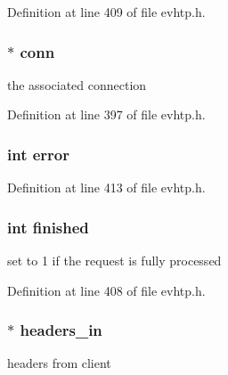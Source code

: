 \-Definition at line 409 of file evhtp.\-h.

\hypertarget{structevhtp__request__s_a313e4d80c47517f02f2fe99e8840c280}{
\subsubsection[{conn}]{$\ast$ {\bf conn}}}\label{structevhtp__request__s_a313e4d80c47517f02f2fe99e8840c280}
the associated connection 

\-Definition at line 397 of file evhtp.\-h.

\hypertarget{structevhtp__request__s_a11614f44ef4d939bdd984953346a7572}{
\subsubsection[{error}]{\setlength{\rightskip}{0pt plus 5cm}int {\bf error}}}\label{structevhtp__request__s_a11614f44ef4d939bdd984953346a7572}


\-Definition at line 413 of file evhtp.\-h.

\hypertarget{structevhtp__request__s_a49c6e6c75d41d6360253beb518425934}{
\subsubsection[{finished}]{\setlength{\rightskip}{0pt plus 5cm}int {\bf finished}}}\label{structevhtp__request__s_a49c6e6c75d41d6360253beb518425934}
set to 1 if the request is fully processed 

\-Definition at line 408 of file evhtp.\-h.

\hypertarget{structevhtp__request__s_a231fb5c9d95add6d73b4500233a98de8}{
\subsubsection[{headers\-\_\-in}]{$\ast$ {\bf headers\-\_\-in}}}\label{structevhtp__request__s_a231fb5c9d95add6d73b4500233a98de8}
headers from client 

